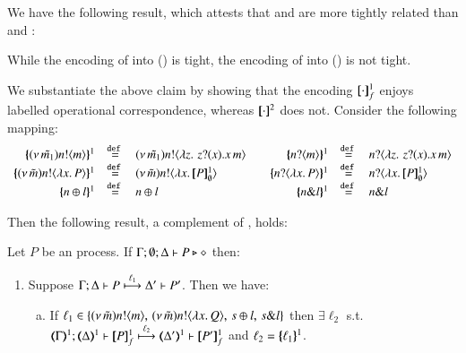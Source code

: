 \documentclass[runningheads]{llncs}
\begin{document}
{We have the following result, which attests that 
\HOp and \HO are more tightly related than \HOp and \sessp:
\begin{theorem}\label{t:tight}
While the encoding of \HOp into \HO () is tight, the encoding of \HOp into \sessp () is not tight.
\end{theorem}

\noi We substantiate the above claim by showing that the encoding $[\!\![\cdot]\!\!]^1_f$ enjoys 
labelled operational correspondence, whereas $[\!\![\cdot]\!\!]^2$ does not. 
Consider the following mapping:
\[
	\begin{array}{rclcrcl}
		\mapa{\news{\tilde{m_1}}\bactout{n}{m}}^{1}	&\defeq&	\news{\tilde{m_1}}\bactout{n}{\abs{z}{\,\binp{z}{x} \appl{x}{m}} }
		& &
		\mapa{\bactinp{n}{m}}^{1}			&\defeq&	\bactinp{n}{\abs{z}{\,\binp{z}{x} \appl{x}{m}} }
		\\
		\mapa{\news{\tilde{m}}\bactout{n}{\abs{x}{P}}}^{1} &\defeq& \news{\tilde{m}}\bactout{n}{\abs{x}{\pmapp{P}{1}{\es}}}
		& &
		\mapa{\bactinp{n}{\abs{x}{P}}}^{1} &\defeq& \bactinp{n}{\abs{x}{\pmapp{P}{1}{\es}}}
		\\
		\mapa{\bactsel{n}{l} }^{1} &\defeq& \bactsel{n}{l} 
		& &
		\mapa{\bactbra{n}{l} }^{1} &\defeq& \bactbra{n}{l} 
	\end{array}
\]



Then the following result, a complement of , holds:

\begin{proposition}
	\label{prop:lts_corr_HOp_to_HO}
	Let $P$ be an \HOp process.
	If $\Gamma; \emptyset; \Delta \vdash P \triangleright \diamond$ then:
%
	\begin{enumerate}[1.]
		\item
			Suppose $\Gamma; \Delta \vdash P \stackrel{\ell_1}{\longmapsto} \Delta' \vdash P'$. Then we have:
%
			\begin{enumerate}[a)]
				\item
					If $\ell_1 \in \{(\nu\, \tilde{m})n ! \langle m \rangle, \,(\nu\, \tilde{m})n ! \langle \lambda x.\,Q \rangle, \,s \oplus l, \,s \& l\}$
					then $\exists \ell_2$ s.t. \\
					$\horel{\tmap{\Gamma}{1}}{\tmap{\Delta}{1}}{\pmapp{P}{1}{f}}{\hby{\ell_2}}{\tmap{\Delta'}{1}}{\pmapp{P'}{1}{f}}$
					and $\ell_2 = \{\!\!\{\ell_1\}\!\!\}^{1}$.
			

\end{enumerate}
\end{enumerate}
\end{proposition}}
\end{document}
